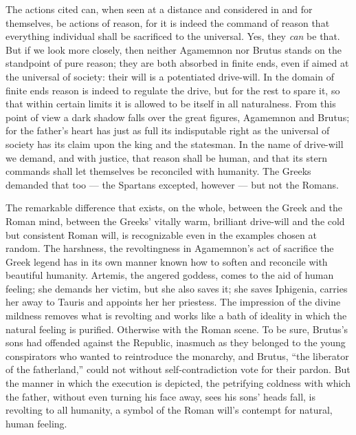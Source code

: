 \documentclass[12pt,a4paper,openany]{book}
\newcommand{\opage}[1]{\marginnote{\footnotesize\textit{[#1]}}}
\begin{document}
The actions cited can, when seen at a distance and considered in and for themselves, be actions of reason, for it is indeed
the command of reason that everything individual shall be sacrificed to the universal. Yes, they \emph{can} be that. But if
we look more closely, then neither Agamemnon nor Brutus stands on the standpoint of pure reason; they are both absorbed in
finite ends, even if aimed at the universal of society: their will is a potentiated drive-will. In the domain of finite ends
reason is indeed to regulate the drive, but for the rest to spare it, so that within certain limits it is allowed to be
itself in all naturalness. From this point of view a dark shadow falls over the great figures, Agamemnon and Brutus; for the
father's heart has just as full its indisputable right as the universal of society has its claim upon the king and the
statesman. In the name of drive-will we demand, and with justice, that reason shall be human, and that its stern commands
shall let themselves be reconciled with humanity. The Greeks demanded that too --- the Spartans excepted, however --- but
not the Romans.


The remarkable difference that exists, on the whole, between the Greek and the Roman mind, between the Greeks' vitally warm,
brilliant drive-will and the cold but consistent Roman will, is recognizable even in the examples chosen at random. The
harshness, the revoltingness in Agamemnon's act of sacrifice the Greek legend has in its own manner known how to soften and
reconcile with beautiful humanity. Artemis, the angered goddess, comes
\setcounter{footnote}{0}%
\opage{26}to the aid of human feeling; she demands her victim, but she also saves it; she saves Iphigenia, carries her away to Tauris and appoints her her
priestess. The impression of the divine mildness removes what is revolting and works like a bath of ideality in which the
natural feeling is purified. Otherwise with the Roman scene. To be sure, Brutus's sons had offended against the Republic,
inasmuch as they belonged to the young conspirators who wanted to reintroduce the monarchy, and Brutus, ``the liberator of
the fatherland,'' could not without self-contradiction vote for their pardon. But the manner in which the execution is
depicted, the petrifying coldness with which the father, without even turning his face away, sees his sons' heads fall, is
revolting to all humanity, a symbol of the Roman will's contempt for natural, human feeling.
\end{document}
